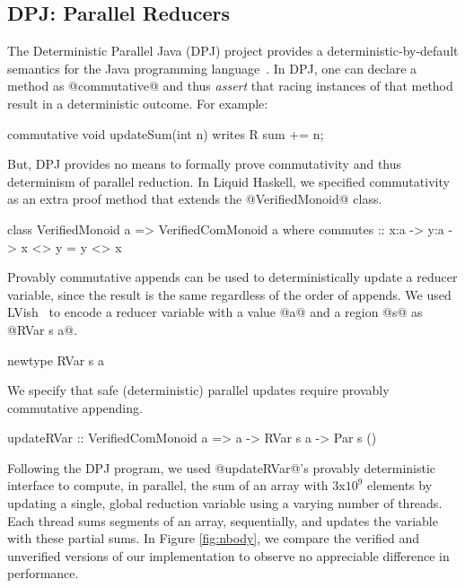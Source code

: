 \subsection{DPJ: Parallel Reducers}
\label{sec:reducer}
The Deterministic Parallel Java (DPJ) project provides
a deterministic-by-default semantics for the Java programming language~\cite{DPJ}.
%
In DPJ, one can declare a method as @commutative@ and thus {\em assert} that
racing instances of that method result in a deterministic outcome.
For example:
%
\begin{code}
  commutative void updateSum(int n) writes R
    { sum += n; }
\end{code}
But, DPJ provides no means to formally prove commutativity and thus
determinism of parallel reduction.
In Liquid Haskell, we specified commutativity as an extra proof method
that extends the @VerifiedMonoid@ class.
%
\begin{mcode}
  class VerifiedMonoid a => VerifiedComMonoid a where
    commutes :: x:a -> y:a -> { x <> y = y <> x }
\end{mcode}
%
Provably commutative appends can be used to deterministically
update a reducer variable, since the result is the same regardless
of the order of appends.
%
We used LVish~\cite{kuper2014freeze} to
encode a reducer variable with a value @a@ and a region @s@
as @RVar s a@.
\begin{mcode}
 newtype RVar s a
\end{mcode}
We specify that safe (\ie deterministic)
parallel updates require provably commutative appending.
\begin{mcode}
  updateRVar :: VerifiedComMonoid a => a -> RVar s a -> Par s ()
\end{mcode}
%
Following the DPJ program, we used @updateRVar@'s provably deterministic interface
to compute, in parallel, the sum of an array with $3$x$10^9$ elements by updating
a single, global reduction variable using a varying number of threads.
%
Each thread sums segments of an array, sequentially, and updates the variable
with these partial sums.
%
In Figure \ref{fig:nbody}, we compare the verified and unverified versions
of our implementation to observe no appreciable
difference in performance.

